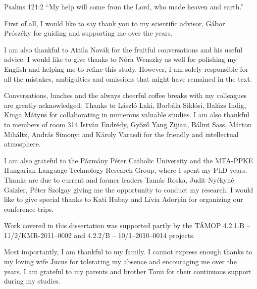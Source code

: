 \begin{chapquote}{Psalms 121:2}
``My help will come from the Lord, who made heaven and earth.''
\end{chapquote}

First of all, I would like to say thank you to my scientific advisor, Gábor Prószéky for guiding and supporting me over the years.

I am also thankful to Attila Novák for the fruitful conversations and his useful advice.
I would like to give thanks to Nóra Wenszky as well for polishing my English and helping me to refine this study.
However, I am solely responsible for all the mistakes, ambiguities and omissions that might have remained in the text.

Conversations, lunches and the always cheerful coffee breaks with my colleagues are greatly acknowledged. 
Thanks to László Laki, Borbála Siklósi, Balázs Indig, Kinga Mátyus for collaborating in numerous valuable studies.
I am also thankful to members of room 314 István Endrédy, Győző Yang Zijian, Bálint Sass, Márton Miháltz, András Simonyi and Károly Varasdi for the friendly and intellectual atmosphere.

I am also grateful to the Pázmány Péter Catholic University and the MTA-PPKE Hungarian Language Technology Research Group, where I spent my PhD years. 
Thanks are due to current and former leaders Tamás Roska, Judit Nyékyné Gaizler, Péter Szolgay giving me the opportunity to conduct my research.
I would like to give special thanks to Kati Hubay and Lívia Adorján for organizing our conference trips.

Work covered in this dissertation was supported partly by the TÁMOP 4.2.1.B -- 11/2/KMR-2011–0002 and 4.2.2/B -- 10/1–2010–0014 projects.

Most importantly, I am thankful to my family.
I cannot express enough thanks to my loving wife Jucus for tolerating my  absence and encouraging me over the years.
I am grateful to my parents and brother Tomi for their continuous support during my studies.
